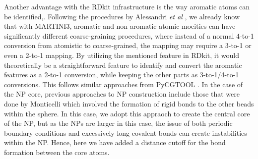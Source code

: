\documentclass[12pt]{article}
\begin{document}
\newline
\newline
Another advantage with the RDkit infrastructure is the way aromatic atoms can be identified,. Following the procedures by Alessandri \emph{et al} \cite{SmallMolecules}, we already know that with MARTINI3, aromatic and non-aromatic atomic moeities can have significantly different coarse-graining procedures, where instead of a normal 4-to-1 conversion from atomistic to coarse-grained, the mapping may require a 3-to-1 or even a 2-to-1 mapping. By utilizing the mentioned feature in RDkit, it would theoretically be a straightforward feature to identify and convert the aromatic features as a 2-to-1 conversion, while keeping the other parts as 3-to-1/4-to-1 conversions. This follows similar approaches from PyCGTOOL \cite{PyCGTool}. In the case of the NP core, previous approaches to NP construction include those that were done by Monticelli \cite{Fullerene} which involved the formation of rigid bonds to the other beads within the sphere. In this case, we adopt this appraoch to create the central core of the NP, but as the NPs are larger in this case, the issue of both periodic boundary conditions and excessively long
covalent bonds can create instabilities within the NP. Hence, here we have added a distance cutoff for the bond formation between the core atoms.
\end{document}
